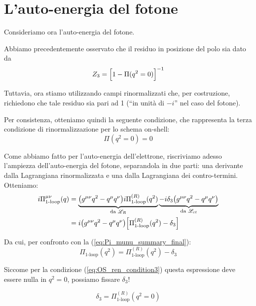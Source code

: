 \documentclass[../main.tex]{subfiles}
\begin{document}
\section{L'auto-energia del fotone}
Consideriamo ora l'auto-energia del fotone.

Abbiamo precedentemente osservato che il residuo in posizione del polo sia dato da
\[Z_3 = \Bigl[ 1-\Pi(q^2=0) \Bigr]^{-1}\]

Tuttavia, ora stiamo utilizzando campi rinormalizzati che, per costruzione, richiedono che tale residuo sia pari ad 1 (“in unità di $-i$” nel caso del fotone).

Per consistenza, otteniamo quindi la seguente condizione, che rappresenta la terza condizione di rinormalizzazione per lo schema on-shell:
\begin{equation}
    \boxed{\Pi(q^2=0)=0}
    \label{eq:OS_ren_condition3}
\end{equation}

Come abbiamo fatto per l'auto-energia dell'elettrone, riscriviamo adesso l'ampiezza dell'auto-energia del fotone, separandola in due parti: una derivante dalla Lagrangiana rinormalizzata e una dalla Lagrangiana dei contro-termini. Otteniamo:
\begin{equation}
    \begin{aligned}
        i\Pi^{\mu\nu}_\text{1-loop}(q) &= \underbrace{\bigl( g^{\mu\nu}q^2 - q^\mu q^\nu \bigr)i\Pi^{(R)}_\text{1-loop}(q^2)}_{\text{da } \mathscr L_{R}} \underbrace{- i\delta_3 \bigl( g^{\mu\nu}q^2 - q^\mu q^\nu \bigr)}_{\text{da } \mathscr L_{ct}}\\
        &=i\bigl( g^{\mu\nu}q^2 - q^\mu q^\nu \bigr)\Bigl[ \Pi^{(R)}_\text{1-loop}(q^2) - \delta_3 \Bigr]
    \end{aligned}
    \label{eq:corrected_photon_propagator_1loop}
\end{equation}

Da cui, per confronto con la (\ref{eq:Pi_munu_summary_final}):
\begin{equation}
    \Pi_\text{1-loop}(q^2) = \Pi^{(R)}_\text{1-loop}(q^2) - \delta_3
\end{equation}

Siccome per la condizione (\ref{eq:OS_ren_condition3}) questa espressione deve essere nulla in $q^2 = 0$, possiamo fissare $\delta_3$!

\begin{equation}
    \boxed{ \delta_3 = \Pi^{(R)}_\text{1-loop}(q^2=0) }
    \label{eq:delta3_fixed}
\end{equation}
\end{document}
